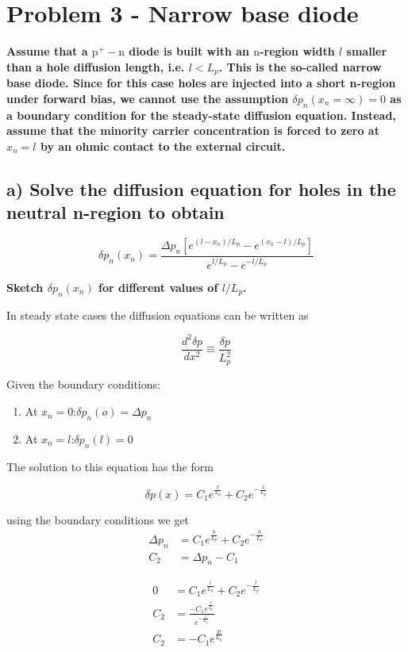 \section{Problem 3 - Narrow base diode}

\textbf{Assume that a $\mathrm{p}^{+}-\mathrm{n}$ diode is built with an $\mathrm{n}$-region width $l$ smaller than a hole diffusion length, i.e. $l<L_p$. This is the so-called narrow base diode. Since for this case holes are injected into a short n-region under forward bias, we cannot use the assumption $\delta p_n\left(x_n=\infty\right)=0$ as a boundary condition for the steady-state diffusion equation. Instead, assume that the minority carrier concentration is forced to zero at $x_n=l$ by an ohmic contact to the external circuit.}
\subsection*{a) Solve the diffusion equation for holes in the neutral n-region to obtain}
$$
\delta p_n\left(x_n\right)=\frac{\Delta p_n\left[e^{\left(l-x_n\right) / L_p}-e^{\left(x_n-l\right) / L_p}\right]}{e^{l / L_p}-e^{-l / L_p}}
$$

\textbf{Sketch $\delta p_n\left(x_n\right)$ for different values of $l / L_p$.}

In steady state cases the diffusion equations can be written as

$$
\frac{d^2 \delta p}{dx^2}\equiv\frac{\delta p}{L_p^2}
$$

Given the boundary conditions:
\begin{enumerate}
    \item At $x_n=0$:$\delta p_n(o)=\Delta p_n$
    \item At $x_n=l$:$\delta p_n(l)=0$
\end{enumerate}

The solution to this equation has the form 

$$\delta p(x)=C_1e^{\frac{x}{L_p}}+C_2e^{-\frac{x}{L_p}}$$

using the boundary conditions we get
\begin{align*}
    \Delta p_n&=C_1e^{\frac{0}{L_p}}+C_2e^{-\frac{0}{L_p}}\\
    C_2&=\Delta p_n-C_1
\end{align*}

\begin{align*}
    0&=C_1e^{\frac{l}{L_p}}+C_2e^{-\frac{l}{L_p}}\\
    C_2&=\frac{-C_1e^{\frac{l}{L_p}}}{e^{-\frac{l}{L_p}}}\\
    C_2&=-C_1e^{\frac{2l}{L_p}}
\end{align*}


